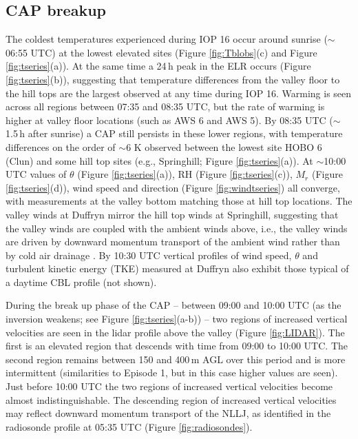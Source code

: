 \documentclass[times]{qjrms4}
\begin{document}
\subsection{CAP breakup}
\label{ep4}
The coldest temperatures experienced during IOP 16 occur around sunrise ($\sim$06:55 UTC) at the lowest elevated sites (Figure \ref{fig:Tblobs}(c) and Figure \ref{fig:tseries}(a)). At the same time a 24$\,\mbox{h}$ peak in the ELR occurs (Figure \ref{fig:tseries}(b)), suggesting that temperature differences from the valley floor to the hill tops are the largest observed at any time during IOP 16. Warming is seen across all regions between 07:35 and 08:35 UTC, but the rate of warming is higher at valley floor locations (such as AWS 6 and AWS 5). By 08:35 UTC ($\sim$1.5$\,\mbox{h}$ after sunrise) a CAP still persists in these lower regions, with temperature differences on the order of $\sim$6 K observed between the lowest site HOBO 6 (Clun) and some hill top sites (e.g., Springhill; Figure \ref{fig:tseries}(a)). At $\sim$10:00 UTC values of $\theta$ (Figure \ref{fig:tseries}(a)), RH (Figure \ref{fig:tseries}(c)), $M_r$ (Figure \ref{fig:tseries}(d)), wind speed and direction (Figure \ref{fig:windtseries}) all converge, with measurements at the valley bottom matching those at hill top locations. The valley winds at Duffryn mirror the hill top winds at Springhill, suggesting that the valley winds are coupled with the ambient winds above, i.e., the valley winds are driven by downward momentum transport of the ambient wind rather than by cold air drainage \citep{whiteman1993relationship}. By 10:30 UTC vertical profiles of wind speed, $\theta$ and turbulent kinetic energy (TKE) measured at Duffryn also exhibit those typical of a daytime CBL profile (not shown).

During the break up phase of the CAP -- between 09:00 and 10:00 UTC (as the inversion weakens; see Figure \ref{fig:tseries}(a-b)) -- two regions of increased vertical velocities are seen in the lidar profile above the valley (Figure \ref{fig:LIDAR}). The first is an elevated region that descends with time from 09:00 to 10:00 UTC. The second region remains between 150 and 400$\,\mbox{m}$ AGL over this period and is more intermittent (similarities to Episode 1, but in this case higher values are seen). Just before 10:00 UTC the two regions of increased vertical velocities become almost indistinguishable. The descending region of increased vertical velocities may reflect downward momentum transport of the NLLJ, as identified in the radiosonde profile at 05:35 UTC (Figure \ref{fig:radiosondes}). 
\end{document}
